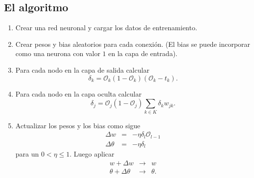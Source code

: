 \documentclass[12pt,letterpaper]{article}
\theoremstyle{definition}
\theoremstyle{definition}
\theoremstyle{definition}
\theoremstyle{definition}
\theoremstyle{definition}
\theoremstyle{definition}
\begin{document}
	\subsection{El algoritmo}
	\begin{enumerate}
		\item Crear una red neuronal y cargar los datos de entrenamiento.
		\item Crear pesos y bias aleatorios para cada conexión. (El bias se puede incorporar como una neurona con valor $ 1 $ en la capa de entrada).
		\item Para cada nodo en la capa de salida calcular
		\[ \delta_{k}=\mathcal{O}_{k}(1-\mathcal{O}_{k})(\mathcal{O}_{k}-t_{k}). \]
		\item Para cada nodo en la capa oculta calcular
		\[ \delta_{j}=\mathcal{O}_{j}(1-\mathcal{O}_{j})\displaystyle\sum_{k\in K}\delta_{k} w_{j k}. \]
		\item Actualizar los pesos y los bias como sigue
		\begin{eqnarray*}
			\Delta w     &=&-\eta \delta_l \mathcal{O}_{l-1}\\
			\Delta \theta&=&-\eta \delta_l
		\end{eqnarray*}
		para un $ 0<\eta\leq 1 $. Luego aplicar
		\begin{eqnarray*}
			w+\Delta w    	    &\to&w \\
			\theta+\Delta \theta&\to&\theta.
		\end{eqnarray*}
	\end{enumerate}
	
\end{document}

